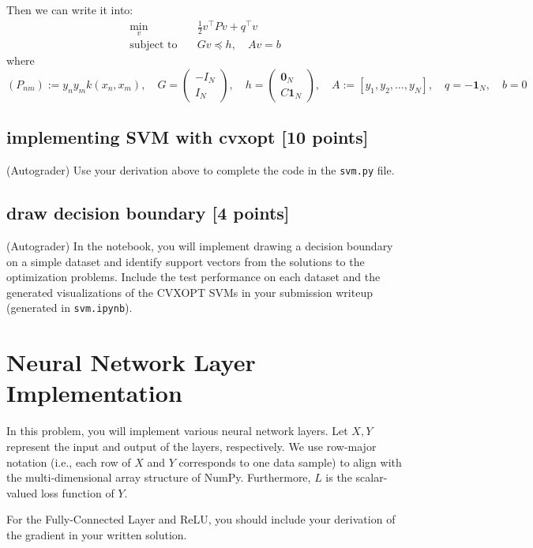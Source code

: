 \documentclass[lang=cn,11pt]{elegantbook}
\begin{document}
\begin{solution}
Then we can write it into: \begin{align}
\min_{v} \quad & \frac{1}{2} v^\top P v + q^\top v \\
\text{subject to} \quad & G v \preceq h, \quad A v = b
\end{align}
where \((P_{nm}) := y_n y_m k(x_n, x_m),\quad    G = \begin{pmatrix} -I_N \\ I_N \end{pmatrix},\quad   h = \begin{pmatrix} \mathbf{0}_N \\ C\mathbf{1}_N \end{pmatrix},\quad    A := [y_1, y_2, \dots, y_N],\quad q=\mathbf{-1}_N, \quad b= 0\)
\end{solution}


\subsection{implementing SVM with cvxopt [10 points]}
(Autograder) Use your derivation above to complete the code in the \texttt{svm.py} file.
\subsection{draw decision boundary [4 points]}
(Autograder)  In the notebook, you will implement drawing a decision boundary on a simple dataset and
identify support vectors from the solutions to the optimization problems. Include the test performance on 
each dataset and the generated visualizations of the CVXOPT SVMs in your submission writeup (generated in \texttt{svm.ipynb}).


\section{Neural Network Layer Implementation}

In this problem, you will implement various neural network layers. Let $X, Y$ represent the input and output of the layers, respectively. We use row-major notation (i.e., each row of $X$ and $Y$ corresponds to one data sample) to align with the multi-dimensional array structure of NumPy. Furthermore, $L$ is the scalar-valued loss function of $Y$.

For the Fully-Connected Layer and ReLU, you should include your derivation of the gradient in your written solution.
\end{document}
